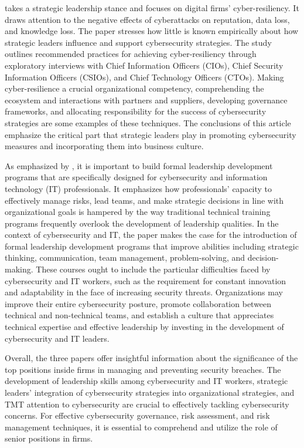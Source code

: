 \documentclass[journal]{IEEEtran}
\begin{document}
\cite{article11} takes a strategic leadership stance and focuses on digital firms' cyber-resiliency. It draws attention to the negative effects of cyberattacks on reputation, data loss, and knowledge loss. The paper stresses how little is known empirically about how strategic leaders influence and support cybersecurity strategies. The study outlines recommended practices for achieving cyber-resiliency through exploratory interviews with Chief Information Officers (CIOs), Chief Security Information Officers (CSIOs), and Chief Technology Officers (CTOs). Making cyber-resilience a crucial organizational competency, comprehending the ecosystem and interactions with partners and suppliers, developing governance frameworks, and allocating responsibility for the success of cybersecurity strategies are some examples of these techniques. The conclusions of this article emphasize the critical part that strategic leaders play in promoting cybersecurity measures and incorporating them into business culture.

As emphasized by \cite{Steps_article3}, it is important to build formal leadership development programs that are specifically designed for cybersecurity and information technology (IT) professionals. It emphasizes how professionals' capacity to effectively manage risks, lead teams, and make strategic decisions in line with organizational goals is hampered by the way traditional technical training programs frequently overlook the development of leadership qualities. In the context of cybersecurity and IT, the paper makes the case for the introduction of formal leadership development programs that improve abilities including strategic thinking, communication, team management, problem-solving, and decision-making. These courses ought to include the particular difficulties faced by cybersecurity and IT workers, such as the requirement for constant innovation and adaptability in the face of increasing security threats. Organizations may improve their entire cybersecurity posture, promote collaboration between technical and non-technical teams, and establish a culture that appreciates technical expertise and effective leadership by investing in the development of cybersecurity and IT leaders.

Overall, the three papers offer insightful information about the significance of the top positions inside firms in managing and preventing security breaches. The development of leadership skills among cybersecurity and IT workers, strategic leaders' integration of cybersecurity strategies into organizational strategies, and TMT attention to cybersecurity are crucial to effectively tackling cybersecurity concerns. For effective cybersecurity governance, risk assessment, and risk management techniques, it is essential to comprehend and utilize the role of senior positions in firms.
\end{document}
